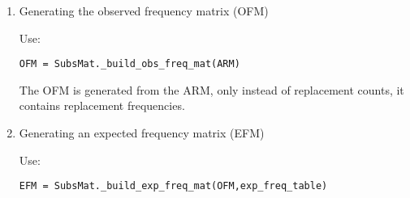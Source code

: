 \begin{enumerate}
\begin{enumerate}
\begin{verbatim}
('A','C'): 10, ('C','A'): 12
\end{verbatim}

as order doesn't matter, user can already provide only one entry:

\begin{verbatim}
('A','C'): 22
\end{verbatim}

 A SeqMat instance may be initialized with either a full (first method of counting: 10, 12) or half (the latter method, 22) matrices. A full protein
   alphabet matrix would be of the size 20x20 = 400. A half matrix of that alphabet would be 20x20/2 + 20/2 = 210. That is because same-letter entries don't
   change. (The matrix diagonal). Given an alphabet size of N:

   \begin{enumerate}
     \item Full matrix size: N*N

     \item Half matrix size: N(N+1)/2
   \end{enumerate}

The SeqMat constructor automatically generates a half-matrix, if a full matrix is passed. If a half matrix is passed, letters in the key should be provided in alphabetical order: ('A','C') and not ('C',A').

At this point, if all you wish to do is generate a log-odds matrix, please go to the section titled Example of Use. The following text describes the nitty-gritty of internal functions, to be used by people who wish to investigate their nucleotide/amino-acid frequency data more thoroughly.

\item Generating the observed frequency matrix (OFM)

Use:
\begin{verbatim}
OFM = SubsMat._build_obs_freq_mat(ARM)
\end{verbatim}

  The OFM is generated from the ARM, only instead of replacement counts, it contains replacement frequencies.

\item Generating an expected frequency matrix (EFM)

Use:

\begin{verbatim}
EFM = SubsMat._build_exp_freq_mat(OFM,exp_freq_table)
\end{verbatim}


\end{enumerate}
\end{enumerate}
